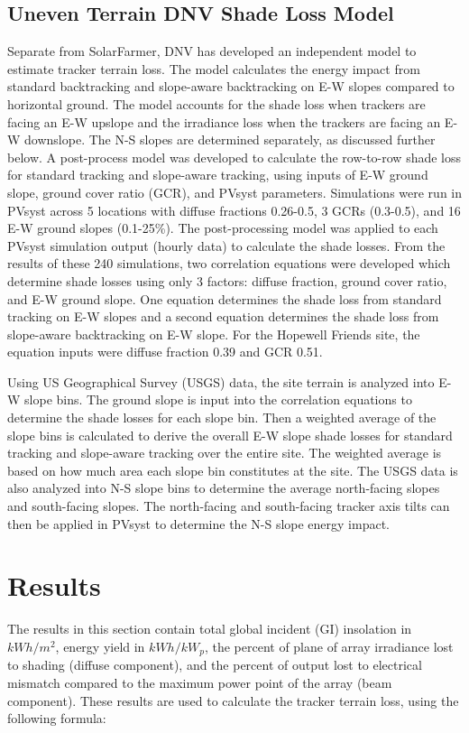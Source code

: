 \documentclass[conference]{IEEEtran}
\begin{document}
\subsection{Uneven Terrain DNV Shade Loss Model}
Separate from SolarFarmer, DNV has developed an independent model to estimate tracker terrain loss. The model calculates the energy impact from standard backtracking and slope-aware backtracking on E-W slopes compared to horizontal ground. The model accounts for the shade loss when trackers are facing an E-W upslope and the irradiance loss when the trackers are facing an E-W downslope. The N-S slopes are determined separately, as discussed further below. A post-process model was developed to calculate the row-to-row shade loss for standard tracking and slope-aware tracking, using inputs of E-W ground slope, ground cover ratio (GCR), and PVsyst parameters. Simulations were run in PVsyst across 5 locations with diffuse fractions 0.26-0.5, 3 GCRs (0.3-0.5), and 16 E-W ground slopes (0.1-25\%). The post-processing model was applied to each PVsyst simulation output (hourly data) to calculate the shade losses. From the results of these 240 simulations, two correlation equations were developed which determine shade losses using only 3 factors: diffuse fraction, ground cover ratio, and E-W ground slope. One equation determines the shade loss from standard tracking on E-W slopes and a second equation determines the shade loss from slope-aware backtracking on E-W slope. For the Hopewell Friends site, the equation inputs were diffuse fraction 0.39 and GCR 0.51.

Using US Geographical Survey (USGS) data, the site terrain is analyzed into E-W slope bins. The ground slope is input into the correlation equations to determine the shade losses for each slope bin. Then a weighted average of the slope bins is calculated to derive the overall E-W slope shade losses for standard tracking and slope-aware tracking over the entire site. The weighted average is based on how much area each slope bin constitutes at the site. The USGS data is also analyzed into N-S slope bins to determine the average north-facing slopes and south-facing slopes. The north-facing and south-facing tracker axis tilts can then be applied in PVsyst to determine the N-S slope energy impact.


\section{Results}

The results in this section contain total global incident (GI) insolation in $kWh/m^2$, energy yield in $kWh/kW_p$, the percent of plane of array irradiance lost to shading (diffuse component), and the percent of output lost to electrical mismatch compared to the maximum power point of the array (beam component). These results are used to calculate the tracker terrain loss, using the following formula:
\end{document}
